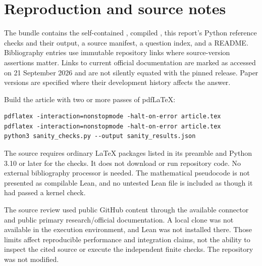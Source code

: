 \documentclass[11pt,a4paper]{article}
\theoremstyle{definition}
\theoremstyle{remark}
\begin{document}
\clearpage
\section{Reproduction and source notes}\label{app:reproduction}

The bundle contains the self-contained , compiled , this report's Python reference checks and their output, a source manifest, a question index, and a README. Bibliography entries use immutable repository links where source-version assertions matter. Links to current official documentation are marked as accessed on 21 September 2026 and are not silently equated with the pinned release. Paper versions are specified where their development history affects the answer.

Build the article with two or more passes of pdfLaTeX:
\par\noindent\begin{minipage}{\linewidth}
\begin{lstlisting}
pdflatex -interaction=nonstopmode -halt-on-error article.tex
pdflatex -interaction=nonstopmode -halt-on-error article.tex
python3 sanity_checks.py --output sanity_results.json
\end{lstlisting}
\end{minipage}\par

The source requires ordinary LaTeX packages listed in its preamble and Python 3.10 or later for the checks. It does not download or run repository code. No external bibliography processor is needed. The mathematical pseudocode is not presented as compilable Lean, and no untested Lean file is included as though it had passed a kernel check.

The source review used public GitHub content through the available connector and public primary research/official documentation. A local clone was not available in the execution environment, and Lean was not installed there. Those limits affect reproducible performance and integration claims, not the ability to inspect the cited source or execute the independent finite checks. The repository was not modified.
\end{document}
